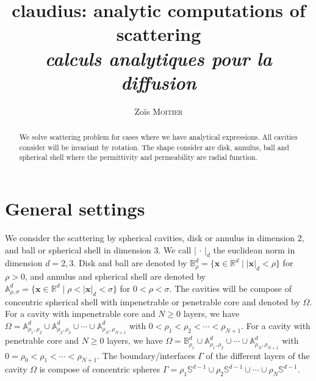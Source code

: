 \documentclass[12pt,a4paper]{article}
\title{claudius: analytic computations of scattering \\ \Large \emph{calculs analytiques pour la diffusion}}
\author{Zoïs \textsc{Moitier}}
\theoremstyle{definition}
\theoremstyle{plain}
\theoremstyle{remark}
\newcommand{\bbA}{\mathbb{A}}
\newcommand{\bbB}{\mathbb{B}}
\newcommand{\bbR}{\mathbb{R}}
\newcommand{\bbS}{\mathbb{S}}
\newcommand{\abs}[1]{\left\lvert#1\right\rvert}
\newcommand{\vx}{\boldsymbol{x}}
\begin{document}
\maketitle

\begin{abstract}
    We solve scattering problem for cases where we have analytical expressions.
    All cavities consider will be invariant by rotation.
    The shape consider are disk, annulus, ball and spherical shell where the permittivity and permeability are radial function.
\end{abstract}

\tableofcontents

\section{General settings}

We consider the scattering by spherical cavities, disk or annulus in dimension $2$, and ball or spherical shell in dimension $3$.
We call $\abs{\,\cdot\,}_d$ the euclidean norm in dimension $d = 2, 3$.
Disk and ball are denoted by $\bbB_\rho^d = \{\vx \in \bbR^d \mid \abs{\vx}_d < \rho\}$ for $\rho > 0$, and annulus and spherical shell are denoted by $\bbA_{\rho, \sigma}^d = \{\vx \in \bbR^d \mid \rho < \abs{\vx}_d < \sigma\}$ for $0 < \rho < \sigma$.
The cavities will be compose of concentric spherical shell with impenetrable or penetrable core and denoted by $\Omega$.
For a cavity with impenetrable core and $N \ge 0$ layers, we have $\Omega = \bbA_{\rho_1, \rho_2}^d \cup \bbA_{\rho_2, \rho_3}^d \cup \cdots \cup \bbA_{\rho_N, \rho_{N+1}}^d$ with $0 < \rho_1 < \rho_2 < \cdots < \rho_{N+1}$.
For a cavity with penetrable core and $N \ge 0$ layers, we have $\Omega = \bbB_{\rho_1}^d \cup \bbA_{\rho_1, \rho_2}^d \cup \cdots \cup \bbA_{\rho_N, \rho_{N+1}}^d$ with $0 = \rho_0 < \rho_1 < \cdots < \rho_{N+1}$.
The boundary/interfaces $\Gamma$ of the different layers of the cavity $\Omega$ is compose of concentric spheres $\Gamma = \rho_1\bbS^{d-1} \cup \rho_2\bbS^{d-1} \cup \cdots \cup \rho_N\bbS^{d-1}$.

\bigskip
\end{document}
